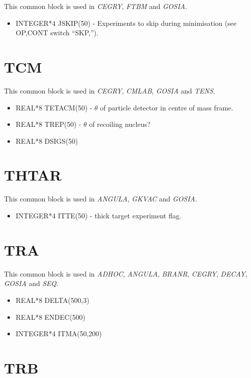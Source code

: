 This common block is used in {\em CEGRY}, {\em FTBM} and {\em GOSIA}.

\begin{itemize}
\item INTEGER*4 JSKIP(50) - Experiments to skip during minimisation (see
OP,CONT switch ``SKP,'').
\end{itemize}

\section{TCM}

This common block is used in {\em CEGRY}, {\em CMLAB}, {\em GOSIA} and {\em
TENS}.

\begin{itemize}
\item REAL*8 TETACM(50) - $\theta$ of particle detector in centre of mass
frame.
\item REAL*8 TREP(50) - $\theta$ of recoiling nucleus?
\item REAL*8 DSIGS(50)
\end{itemize}

\section{THTAR}

This common block is used in {\em ANGULA}, {\em GKVAC} and {\em GOSIA}.

\begin{itemize}
\item INTEGER*4 ITTE(50) - thick target experiment flag.
\end{itemize}

\section{TRA}

This common block is used in {\em ADHOC}, {\em ANGULA}, {\em BRANR}, {\em
CEGRY}, {\em DECAY}, {\em GOSIA} and {\em SEQ}.

\begin{itemize}
\item REAL*8 DELTA(500,3)
\item REAL*8 ENDEC(500)
\item INTEGER*4 ITMA(50,200)
\end{itemize}

\section{TRB}

